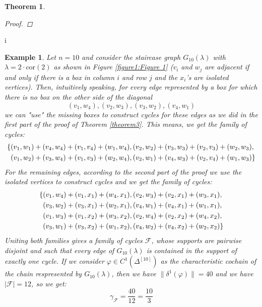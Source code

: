 \documentclass{article}
\newtheorem{thm}{Theorem}[section]
\newtheorem{expl}{Example}[section]
\begin{document}
\begin{thm}
\begin{proof}
\end{proof}
\end{thm}
i
\begin{expl}
Let $n=10$ and consider the staircase graph $G_{10}(\lambda)$ with $\lambda=2\cdot\text{cor}(2)$ as shown in Figure \ref{figure1:Figure 1} ($v_i$ and $w_j$ are adjacent if and only if there is a box in column $i$ and row $j$ and the $x_i$'s are isolated vertices). Then, intuitively speaking, for every edge represented by a box for which there is no box on the other side of the diagonal
\[
(v_1,w_4),(v_2,w_3),(v_3,w_2),(v_4,w_1)
\]
we can "use" the missing boxes to construct cycles for these edges as we did in the first part of the proof of Theorem \ref{theorem3}. This means, we get the family of cycles:
\begin{align}
\{&(v_1,w_1)+(v_4,w_4)+(v_1,v_4)+(w_1,w_4),(v_2,w_2)+(v_3,w_3)+(v_2,v_3)+(w_2,w_3),\notag\\
&(v_1,w_2)+(v_3,w_4)+(v_1,v_3)+(w_2,w_4),(v_2,w_1)+(v_4,w_3)+(v_2,v_4)+(w_1,w_3)\}\notag
\end{align}
For the remaining edges, according to the second part of the proof we use the isolated vertices to construct cycles and we get the family of cycles:
\begin{align}
\{&(v_1,w_4)+(v_1,x_1)+(w_4,x_1),(v_2,w_3)+(v_2,x_1)+(w_3,x_1),\notag\\
&(v_3,w_2)+(v_3,x_1)+(w_2,x_1),(v_4,w_1)+(v_4,x_1)+(w_1,x_1),\notag\\
&(v_1,w_3)+(v_1,x_2)+(w_3,x_2),(v_2,w_4)+(v_2,x_2)+(w_4,x_2),\notag\\
&(v_3,w_1)+(v_3,x_2)+(w_1,x_2),(v_4,w_2)+(v_4,x_2)+(w_2,x_2)\}\notag
\end{align}
Uniting both families gives a family of cycles $\mathcal{F}$, whose supports are pairwise disjoint and such that every edge of $G_{10}(\lambda)$ is contained in the support of exactly one cycle. If we consider $\varphi\in C^1(\Delta^{[10]})$ as the characteristic cochain of the chain respresented by $G_{10}(\lambda)$, then we have $\|\delta^1(\varphi)\|=40$ and we have $|\mathcal{F}|=12$, so we get:
\[
\gamma_{\mathcal{F}}=\frac{40}{12}=\frac{10}{3}
\]

\begin{figure}[ht]
\centering
{}
\end{figure}
\end{expl}
\end{document}
